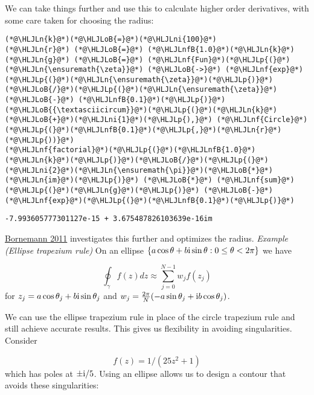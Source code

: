 \documentclass[12pt,landscape]{article}
\newcommand{\HLJLn}[1]{#1}
\newcommand{\HLJLnf}[1]{\textcolor[RGB]{66,102,213}{#1}}
\newcommand{\HLJLnfB}[1]{\textcolor[RGB]{59,151,46}{#1}}
\newcommand{\HLJLni}[1]{\textcolor[RGB]{59,151,46}{#1}}
\newcommand{\HLJLoB}[1]{\textcolor[RGB]{102,102,102}{\textbf{#1}}}
\newcommand{\HLJLp}[1]{#1}
\def\I{ {\rm i} }
\begin{document}
{We can take things further and use this to calculate higher order derivatives, with some care taken for choosing the radius:


\begin{lstlisting}
(*@\HLJLn{k}@*)(*@\HLJLoB{=}@*)(*@\HLJLni{100}@*)
(*@\HLJLn{r}@*) (*@\HLJLoB{=}@*) (*@\HLJLnfB{1.0}@*)(*@\HLJLn{k}@*)
(*@\HLJLn{g}@*) (*@\HLJLoB{=}@*) (*@\HLJLnf{Fun}@*)(*@\HLJLp{(}@*) (*@\HLJLn{\ensuremath{\zeta}}@*) (*@\HLJLoB{->}@*) (*@\HLJLnf{exp}@*)(*@\HLJLp{(}@*)(*@\HLJLn{\ensuremath{\zeta}}@*)(*@\HLJLp{)}@*)(*@\HLJLoB{/}@*)(*@\HLJLp{(}@*)(*@\HLJLn{\ensuremath{\zeta}}@*) (*@\HLJLoB{-}@*) (*@\HLJLnfB{0.1}@*)(*@\HLJLp{)}@*)(*@\HLJLoB{{\textasciicircum}}@*)(*@\HLJLp{(}@*)(*@\HLJLn{k}@*)(*@\HLJLoB{+}@*)(*@\HLJLni{1}@*)(*@\HLJLp{),}@*) (*@\HLJLnf{Circle}@*)(*@\HLJLp{(}@*)(*@\HLJLnfB{0.1}@*)(*@\HLJLp{,}@*)(*@\HLJLn{r}@*)(*@\HLJLp{))}@*)
(*@\HLJLnf{factorial}@*)(*@\HLJLp{(}@*)(*@\HLJLnfB{1.0}@*)(*@\HLJLn{k}@*)(*@\HLJLp{)}@*)(*@\HLJLoB{/}@*)(*@\HLJLp{(}@*)(*@\HLJLni{2}@*)(*@\HLJLn{\ensuremath{\pi}}@*)(*@\HLJLoB{*}@*)(*@\HLJLn{im}@*)(*@\HLJLp{)}@*) (*@\HLJLoB{*}@*) (*@\HLJLnf{sum}@*)(*@\HLJLp{(}@*)(*@\HLJLn{g}@*)(*@\HLJLp{)}@*) (*@\HLJLoB{-}@*) (*@\HLJLnf{exp}@*)(*@\HLJLp{(}@*)(*@\HLJLnfB{0.1}@*)(*@\HLJLp{)}@*)
\end{lstlisting}

\begin{lstlisting}
-7.993605777301127e-15 + 3.675487826103639e-16im
\end{lstlisting}


\href{https://www-m3.ma.tum.de/foswiki/pub/M3/Allgemeines/FolkmarBornemannPublications/FoCM_Stability_Cauchy_Integrals.pdf}{Bornemann 2011} investigates this further and optimizes the radius.
\newpage
\emph{Example (Ellipse trapezium rule)} On an ellipse $\{a \cos \theta + b \I \sin \theta : 0 \leq \theta < 2 \pi\}$ we have

\[
\oint_\gamma f(z) dz \approx  \sum_{j=0}^{N-1} w_j f(z_j)
\]
for $z_j = a \cos \theta_j + b \I \sin \theta_j$ and $w_j = {2 \pi \over N} (-a \sin \theta_j + \I b \cos \theta_j)$.

We can use the ellipse trapezium rule in place of the circle trapezium rule and still achieve accurate results. This gives us flexibility in avoiding singularities. Consider

\[
f(z) = 1/(25z^2 + 1)
\]
which has poles at $\pm  \I/5$. Using an ellipse allows us to design a contour that avoids these singularities:


}
\end{document}

